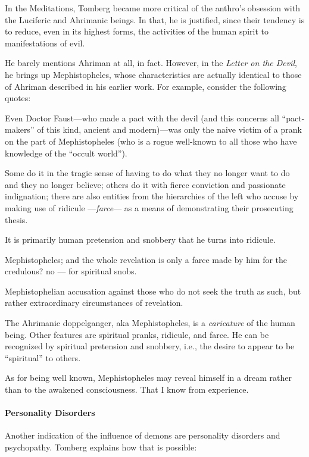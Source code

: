 In the Meditations, Tomberg became more critical of the anthro's obsession with the Luciferic and Ahrimanic
beings. In that, he is justified, since their tendency is to reduce, even in its highest forms, the activities of the
human spirit to manifestations of evil.

He barely mentions Ahriman at all, in fact. However, in the \textit{Letter on the Devil}, he brings up Mephistopheles, whose
characteristics are actually identical to those of Ahriman described in his earlier work. For example, consider the
following quotes:

\begin{quotex}
Even Doctor Faust—who made a pact with the devil (and this concerns all “pact-makers” of this kind, ancient
and modern)—was only the naive victim of a prank on the part of Mephistopheles (who is a rogue well-known
to all those who have knowledge of the “occult world”).

Some do it in the tragic sense of having to do what they no longer want to do and they no longer believe; others do it
with fierce conviction and passionate indignation; there are also entities from the hierarchies of the left who accuse
by making use of ridicule —\emph{farce}— as a means of demonstrating their prosecuting thesis.

It is primarily human pretension and snobbery that he turns into ridicule.

Mephistopheles; and the whole revelation is only a farce made by him for the credulous? no — for spiritual
snobs.

Mephistophelian accusation against those who do not seek the truth as such, but rather extraordinary circumstances of
revelation.

\end{quotex}
The Ahrimanic doppelganger, aka Mephistopheles, is a \emph{caricature} of the human being. Other features are spiritual
pranks, ridicule, and farce. He can be recognized by spiritual pretension and snobbery, i.e., the desire to appear to
be “spiritual” to others.

As for being well known, Mephistopheles may reveal himself in a dream rather than to the awakened consciousness. That I
know from experience.

\paragraph{Personality Disorders}
Another indication of the influence of demons are personality disorders and psychopathy. Tomberg explains how that is
possible:

